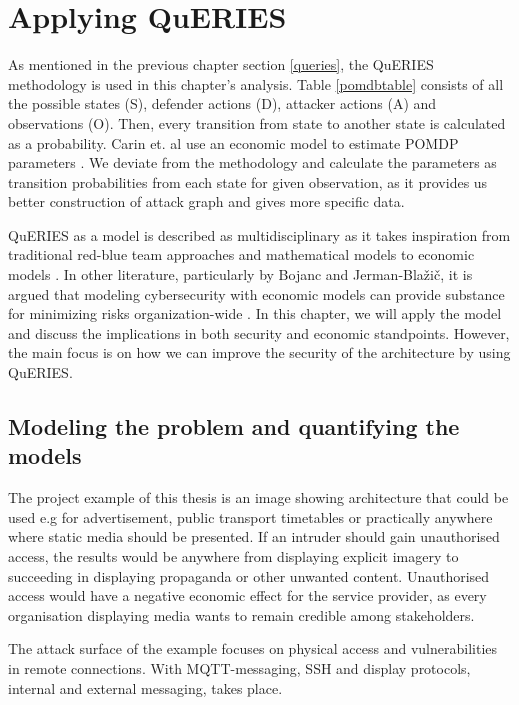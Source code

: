 \chapter{Applying QuERIES} \label{analysis}

As mentioned in the previous chapter section \ref{queries}, the
QuERIES methodology is used in this chapter's analysis. Table
\ref{pomdbtable} consists of all the possible states (S), defender
actions (D), attacker actions (A) and observations (O). Then, every
transition from state to another state is calculated as a
probability. Carin et. al use an economic model to estimate POMDP
parameters \cite{carin2008cybersecurity}. We deviate from the
methodology and calculate the parameters as transition probabilities
from each state for given observation, as it provides us better
construction of attack graph and gives more specific data.

QuERIES as a model is described as multidisciplinary as it takes
inspiration from traditional red-blue team approaches and mathematical
models to economic models \cite{hughes2013quantitative}. In other
literature, particularly by Bojanc and Jerman-Blažič, it is argued that
modeling cybersecurity with economic models can provide substance for
minimizing risks organization-wide \cite{jerman2008economic}. In this
chapter, we will apply the model and discuss the implications in both
security and economic standpoints. However, the main focus is on how we can improve the security of the architecture by using QuERIES. 

\section{Modeling the problem and quantifying the models} \label{modprob}

The project example of this thesis is an image showing architecture
that could be used e.g for advertisement, public transport timetables
or practically anywhere where static media should be presented. If an
intruder should gain unauthorised access, the results would be
anywhere from displaying explicit imagery to succeeding in displaying
propaganda or other unwanted content. Unauthorised access would have a
negative economic effect for the service provider, as every
organisation displaying media wants to remain credible among
stakeholders.

The attack surface of the example focuses on physical access
and vulnerabilities in remote connections. With MQTT-messaging, SSH
and display protocols, internal and external messaging, takes place.

